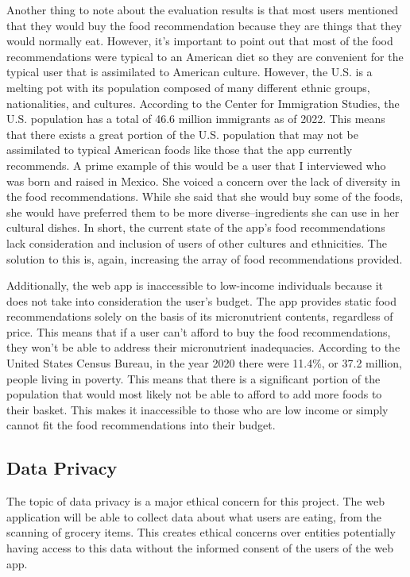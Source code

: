 \documentclass[10pt,twocolumn]{article}
\begin{document}
Another thing to note about the evaluation results is that most users mentioned that they would buy the food recommendation because they are things that they would normally eat. However, it’s important to point out that most of the food recommendations were typical to an American diet so they are convenient for the typical user that is assimilated to American culture. However, the U.S. is a melting pot with its population composed of many different ethnic groups, nationalities, and cultures. According to the Center for Immigration Studies, the U.S. population has a total of 46.6 million immigrants as of 2022.\cite{camarota_zeigleron} This means that there exists a great portion of the U.S. population that may not be assimilated to typical American foods like those that the app currently recommends. A prime example of this would be a user that I interviewed who was born and raised in Mexico. She voiced a concern over the lack of diversity in the food recommendations. While she said that she would buy some of the foods, she would have preferred them to be more diverse–ingredients she can use in her cultural dishes. In short, the current state of the app’s food recommendations lack consideration and inclusion of users of other cultures and ethnicities. The solution to this is, again, increasing the array of food recommendations provided. 

Additionally, the web app is inaccessible to low-income individuals because it does not take into consideration the user’s budget. The app provides static food recommendations solely on the basis of its micronutrient contents, regardless of price. This means that if a user can't afford to buy the food recommendations, they won't be able to address their micronutrient inadequacies. According to the United States Census Bureau, in the year 2020 there were 11.4\%, or 37.2 million, people living in poverty.\cite{bureau_2022} This means that there is a significant portion of the population that would most likely not be able to afford to add more foods to their basket. This makes it inaccessible to those who are low income or simply cannot fit the food recommendations into their budget. 

\subsection{Data Privacy}

The topic of data privacy is a major ethical concern for this project. The web application will be able to collect data about what users are eating, from the scanning of grocery items. This creates ethical concerns over entities potentially having access to this data without the informed consent of the users of the web app. 
\end{document}
